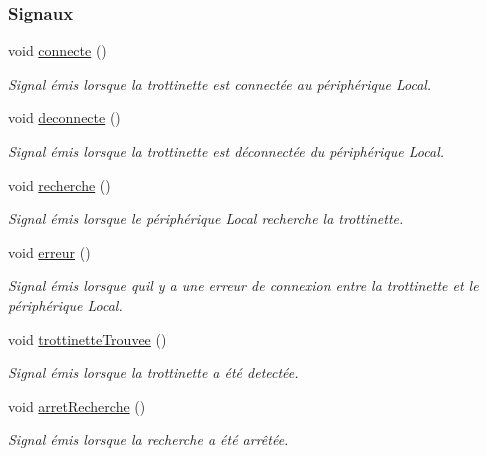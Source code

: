 \subsubsection*{Signaux}
\begin{DoxyCompactItemize}
\item 
void \hyperlink{class_peripherique_local_a7495daea266cb24dec35d85c651bd4c5}{connecte} ()
\begin{DoxyCompactList}\small\item\em Signal émis lorsque la trottinette est connectée au périphérique Local. \end{DoxyCompactList}\item 
void \hyperlink{class_peripherique_local_a2a8f0b072821f6d76db20b6f73b6acd0}{deconnecte} ()
\begin{DoxyCompactList}\small\item\em Signal émis lorsque la trottinette est déconnectée du périphérique Local. \end{DoxyCompactList}\item 
void \hyperlink{class_peripherique_local_a017f86e371bad418585d28b97557248a}{recherche} ()
\begin{DoxyCompactList}\small\item\em Signal émis lorsque le périphérique Local recherche la trottinette. \end{DoxyCompactList}\item 
void \hyperlink{class_peripherique_local_a41d9e18f2fd7e8e872db5fd3f21b11ff}{erreur} ()
\begin{DoxyCompactList}\small\item\em Signal émis lorsque qu\textquotesingle{}il y a une erreur de connexion entre la trottinette et le périphérique Local. \end{DoxyCompactList}\item 
void \hyperlink{class_peripherique_local_ad388116a3ad558055dcf02fa854ab361}{trottinette\+Trouvee} ()
\begin{DoxyCompactList}\small\item\em Signal émis lorsque la trottinette a été detectée. \end{DoxyCompactList}\item 
void \hyperlink{class_peripherique_local_a05dad5bf82b579731591407a0c098957}{arret\+Recherche} ()
\begin{DoxyCompactList}\small\item\em Signal émis lorsque la recherche a été arrêtée. \end{DoxyCompactList}\item 

\end{DoxyCompactItemize}
